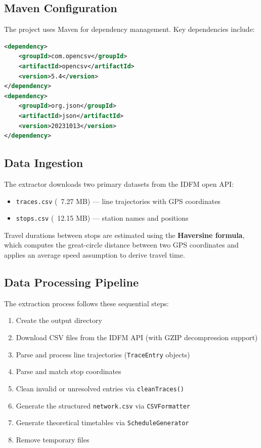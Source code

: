 \documentclass[12pt,a4paper]{article}
\begin{document}
\subsection{Maven Configuration}

The project uses Maven for dependency management. Key dependencies include:

\begin{lstlisting}[language=XML]
<dependency>
    <groupId>com.opencsv</groupId>
    <artifactId>opencsv</artifactId>
    <version>5.4</version>
</dependency>
<dependency>
    <groupId>org.json</groupId>
    <artifactId>json</artifactId>
    <version>20231013</version>
</dependency>
\end{lstlisting}

\subsection{Data Ingestion}

The extractor downloads two primary datasets from the IDFM open API:

\begin{itemize}
    \item \texttt{traces.csv} (~7.27 MB) --- line trajectories with GPS coordinates
    \item \texttt{stops.csv} (~12.15 MB) --- station names and positions
\end{itemize}

Travel durations between stops are estimated using the \textbf{Haversine formula}, which computes the great-circle distance between two GPS coordinates and applies an average speed assumption to derive travel time.

\subsection{Data Processing Pipeline}

The extraction process follows these sequential steps:

\begin{enumerate}
    \item Create the output directory
    \item Download CSV files from the IDFM API (with GZIP decompression support)
    \item Parse and process line trajectories (\texttt{TraceEntry} objects)
    \item Parse and match stop coordinates
    \item Clean invalid or unresolved entries via \texttt{cleanTraces()}
    \item Generate the structured \texttt{network.csv} via \texttt{CSVFormatter}
    \item Generate theoretical timetables via \texttt{ScheduleGenerator}
    \item Remove temporary files
\end{enumerate}
\end{document}
